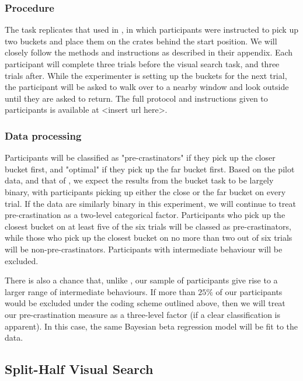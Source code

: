 \documentclass[]{rsos}
\begin{document}
\subsubsection{Procedure}

The task replicates that used in \cite{fournier2019task}, in which participants were instructed to pick up two buckets and place them on the crates behind the start position. We will closely follow the methods and instructions as described in their appendix. Each participant will complete three trials before the visual search task, and three trials after. While the experimenter is setting up the buckets for the next trial, the participant will be asked to walk over to a nearby window and look outside until they are asked to return. The full protocol and instructions given to participants is available at <insert url here>. 

\subsubsection{Data processing}

Participants will be classified as "pre-crastinators" if they pick up the closer bucket first, and "optimal" if they pick up the far bucket first. Based on the pilot data, and that of \cite{fournier2019task}, we expect the results from the bucket task to be largely binary, with participants picking up either the close or the far bucket on every trial. If the data are similarly binary in this experiment, we will continue to treat pre-crastination as a two-level categorical factor. Participants who pick up the closest bucket on at least five of the six trials will be classed as pre-crastinators, while those who pick up the closest bucket on no more than two out of six trials will be non-pre-crastinators. Participants with intermediate behaviour will be excluded. 

There is also a chance that, unlike \cite{fournier2019task}, our sample of participants give rise to a larger range of intermediate behaviours. If more than $25\%$ of our participants would be excluded under the coding scheme outlined above, then we will treat our pre-crastination measure as a three-level factor (if a clear classification is apparent). In this case, the same Bayesian beta regression model will be fit to the data. 

\subsection{Split-Half Visual Search}
\end{document}
